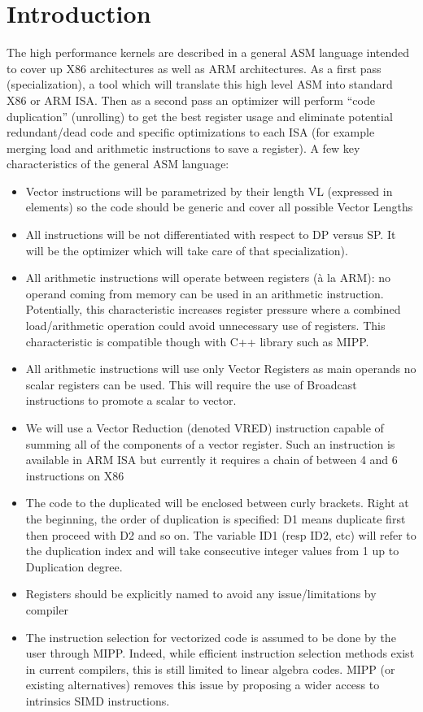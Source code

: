 \documentclass[sigconf,review]{acmart}
\begin{document}
\section{Introduction}
The high performance kernels are described in a general ASM language intended to cover up X86 architectures as well as ARM architectures. As a first pass (specialization), a tool which will translate this high level ASM into standard X86 or ARM ISA. Then as a second pass an optimizer will perform “code duplication” (unrolling) to get the best register usage and eliminate potential redundant/dead code and specific optimizations to each ISA (for example merging load and arithmetic instructions to save a register).
A few key characteristics of the general ASM language:
\begin{itemize}
  \item Vector instructions will be parametrized by their length VL (expressed in elements) so the code should be generic and cover all possible Vector Lengths
\item All instructions will be not differentiated with respect to DP versus SP. It will be the optimizer which will take care of that specialization).
\item All arithmetic instructions will operate between registers (à la ARM): no operand coming from memory can be used in an arithmetic instruction. Potentially, this characteristic increases register pressure where a combined load/arithmetic operation could avoid unnecessary use of registers. This characteristic is compatible though with C++ library such as MIPP. 
\item All arithmetic instructions will use only Vector Registers as main operands no scalar registers can be used. This will require the use of Broadcast instructions to promote a scalar to vector.
\item We will use a Vector Reduction (denoted VRED) instruction capable of summing all of the components of a vector register. Such an instruction is available in ARM ISA but currently it requires a chain of between 4 and 6 instructions on X86
\item The code to the duplicated will be enclosed between curly brackets. Right at the beginning, the order of duplication is specified: D1 means duplicate first then proceed with D2 and so on. The variable ID1 (resp ID2, etc) will refer to the duplication index and will take consecutive integer values from 1 up to Duplication degree.
\item Registers should be explicitly named to avoid any issue/limitations by compiler
\item The instruction selection for vectorized code is assumed to be done by the user through MIPP. Indeed, while efficient instruction selection methods exist in current compilers, this is still limited to linear algebra codes. MIPP (or existing alternatives) removes this issue by proposing a wider access to intrinsics SIMD instructions.
\end{itemize}
\end{document}
